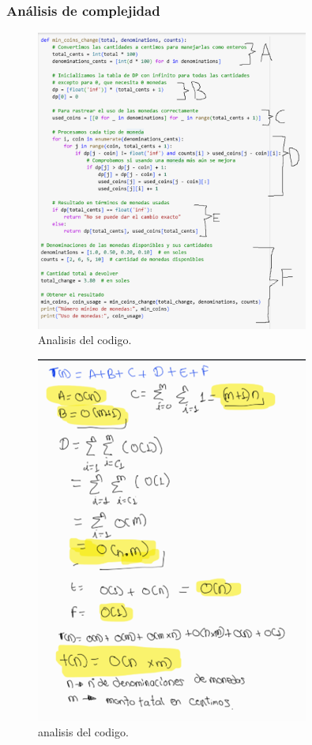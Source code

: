 \subsubsection{Análisis de complejidad}
\begin{figure}[H]
    \centering
    \includegraphics[width=0.8\textwidth]{complejidad_1.png}
    \caption{Analisis del codigo.}
    \label{fig:complejidad1}
\end{figure}

\begin{figure}[H]
    \centering
    \includegraphics[width=0.8\textwidth]{complejidad_2.png}
    \caption{analisis del codigo.}
    \label{fig:complejidad2}
\end{figure}

